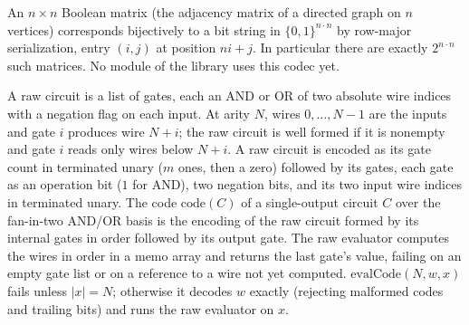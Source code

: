 \begin{definition}
  \label{def:encodings-adj-matrix}
  \leanok
  An $n \times n$ Boolean matrix (the adjacency matrix of a directed graph on
  $n$ vertices) corresponds bijectively to a bit string in
  $\{0,1\}^{n \cdot n}$ by row-major serialization, entry $(i, j)$ at
  position $n i + j$. In particular there are exactly $2^{n \cdot n}$ such
  matrices. No module of the library uses this codec yet.
\end{definition}

\begin{definition}
  \label{def:encodings-circuit-code}
  \leanok
  A raw circuit is a list of gates, each an AND or OR of two absolute wire
  indices with a negation flag on each input. At arity $N$, wires
  $0, \dots, N-1$ are the inputs and gate $i$ produces wire $N + i$; the raw
  circuit is well formed if it is nonempty and gate $i$ reads only wires
  below $N + i$. A raw circuit is encoded as its gate count in terminated
  unary ($m$ ones, then a zero) followed by its gates, each gate as an
  operation bit ($1$ for AND), two negation bits, and its two input wire
  indices in terminated unary. The code $\mathrm{code}(C)$ of a
  single-output circuit $C$ over the fan-in-two AND/OR basis is the encoding
  of the raw circuit formed by its internal gates in order followed by its
  output gate. The raw evaluator computes the wires in order in a memo
  array and returns the last gate's value, failing on an empty gate list or
  on a reference to a wire not yet computed. $\mathrm{evalCode}(N, w, x)$
  fails unless $|x| = N$; otherwise it decodes $w$ exactly (rejecting
  malformed codes and trailing bits) and runs the raw evaluator on $x$.
\end{definition}

